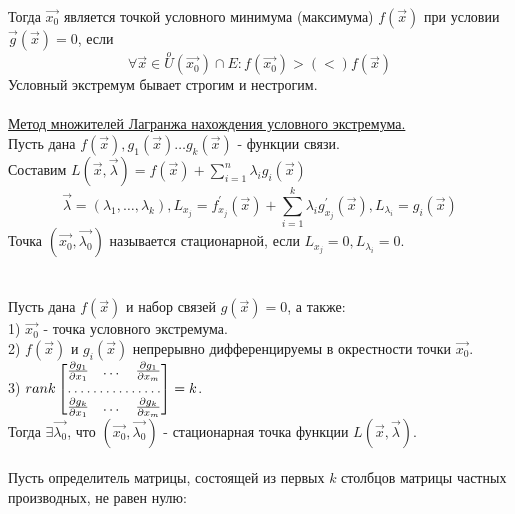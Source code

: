 \documentclass[12pt]{article}
\begin{document}
Тогда $\overrightarrow{x_0}$ является точкой условного минимума (максимума) $f (\overrightarrow{x})$ при условии $\overrightarrow{g}(\overrightarrow{x}) = 0$, если\\
$$\forall \overrightarrow{x} \in \overset{o}{U}(\overrightarrow{x_0}) \cap E : f(\overrightarrow{x_0}) >(<) f(\overrightarrow{x})$$
Условный экстремум бывает строгим и нестрогим.\\
\\
\label{question18_2}\uline{Метод множителей Лагранжа нахождения условного экстремума.}\\
Пусть дана $f(\overrightarrow{x}), g_1(\overrightarrow{x})\dots g_{k}(\overrightarrow{x})$ - функции связи.\\
Составим $L(\overrightarrow{x}, \overrightarrow{\lambda})=f(\overrightarrow{x})+\sum_{i=1}^n \lambda_i g_i (\overrightarrow{x})$\\
$$\overrightarrow{\lambda} = (\lambda_1, \dots, \lambda_k), L_{x_j}=f^{'}_{x_j}(\overrightarrow{x})+\sum_{i=1}^k \lambda_i g^{'}_{{x_j}}(\overrightarrow{x}), L_{\lambda_i}=g_i(\overrightarrow{x})$$
Точка $(\overrightarrow{x_0}, \overrightarrow{\lambda_0})$ называется стационарной, если $L_{x_j} = 0, L_{\lambda_i}=0$.\\
\\
\\
Пусть дана $f(\overrightarrow{x})$ и набор связей $g(\overrightarrow{x}) = 0$, а также:\\
1) $\overrightarrow{x_0}$ - точка условного экстремума.\\
2) $f(\overrightarrow{x})$ и $g_i(\overrightarrow{x})$ непрерывно дифференцируемы в окрестности точки $\overrightarrow{x_0}$.\\
3) $rank \begin{bmatrix}
   \frac{\partial g_1}{\partial x_1} & \dots & \frac{\partial g_1}{\partial x_m} \\
    \hdotsfor{3} \\
    \frac{\partial g_k}{\partial x_1} & \dots & \frac{\partial g_k}{\partial x_m} \\
\end{bmatrix} =k$.\\
Тогда $\exists \overrightarrow{\lambda_0}$, что $(\overrightarrow{x_0}, \overrightarrow{\lambda_0})$ - стационарная точка функции $L(\overrightarrow{x}, \overrightarrow{\lambda})$.\\
\\
Пусть определитель матрицы, состоящей из первых $k$ столбцов матрицы частных производных, не равен нулю:\\
\end{document}
